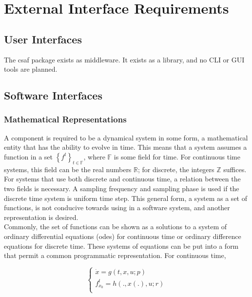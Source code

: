 \chapter{External Interface Requirements}

\section{User Interfaces}

The \acrshort{csaf}  package exists as middleware. It exists as a library, and no CLI or GUI tools are planned.

\section{Software Interfaces}

\subsection{Mathematical Representations}
A component is required to be a dynamical system in some form, a mathematical entity that has the ability to 
evolve in time. This means that a system assumes a function in a set $\left\{ f^t \right\}_{t \in \mathbb F}$, 
where $\mathbb F$ is some field for time. For continuous time systems, this field can be the real numbers $
\mathbb R$; for discrete, the integers $\mathbb Z$ suffices. For systems that use both discrete and 
continuous time, a relation between the two fields is necessary. A sampling frequency and sampling phase is 
used if the discrete time system is uniform time step. This general form, a system as a set of functions, is not 
conducive towards using in a software system, and another representation is desired. \\

Commonly, the set of functions can be shown as a solutions to a system of ordinary differential equations 
(\acrshort{ode}s) for continuous time or ordinary difference equations for discrete time. These systems of 
equations can be put into a form that permit a common programmatic representation. For continuous time,

\begin{equation}
\begin{cases}
\dot x = g(t, x, u; p) \\
f_{x_0}^t = h(., x(.), u; r) \\
\end{cases}
\end{equation}

